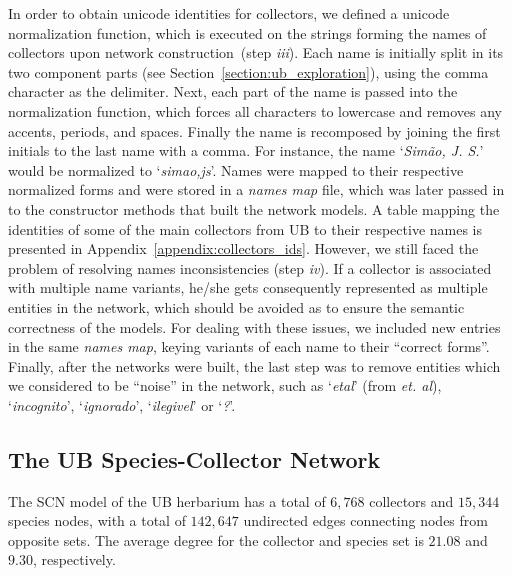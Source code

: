 In order to obtain unicode identities for collectors, we defined a unicode normalization function, which is executed on the strings forming the names of collectors upon network construction~(step \textit{iii}).
Each name is initially split in its two component parts (see Section~\ref{section:ub_exploration}), using the comma character as the delimiter.
Next, each part of the name is passed into the normalization function, which forces all characters to lowercase and removes any accents, periods, and spaces. 
Finally the name is recomposed by joining the first initials to the last name with a comma.
For instance, the name `\textit{Simão, J. S.}' would be normalized to `\textit{simao,js}'.
Names were mapped to their respective normalized forms and were stored in a \textit{names map} file, which was later passed in to the constructor methods that built the network models.
A table mapping the identities of some of the main collectors from UB to their respective names is presented in Appendix~\ref{appendix:collectors_ids}.
However, we still faced the problem of resolving names inconsistencies (step \textit{iv}).
If a collector is associated with multiple name variants, he/she gets consequently represented as multiple entities in the network, which should be avoided as to ensure the semantic correctness of the models.
For dealing with these issues, we included new entries in the same \textit{names map}, keying variants of each name to their ``correct forms''.
Finally, after the networks were built, the last step was to remove entities which we considered to be ``noise'' in the network, such as `\textit{etal}' (from \textit{et. al}), `\textit{incognito}', `\textit{ignorado}', `\textit{ilegivel}' or `\textit{?}'.

\subsection{The UB Species-Collector Network} \label{section:ub_scn}

The SCN model of the UB herbarium has a total of $6,768$ collectors and $15,344$ species nodes, with a total of $142,647$ undirected edges connecting nodes from opposite sets. 
The average degree for the collector and species set is $21.08$ and $9.30$, respectively.

